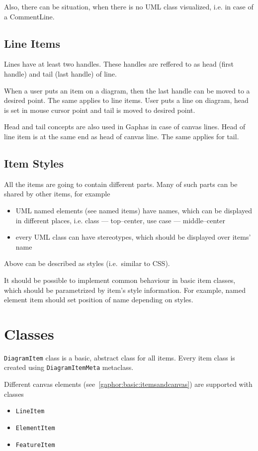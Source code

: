 \documentclass{book}
\newcommand{\rclass}[1]{\texttt{#1}}
\begin{document}
Also, there can be situation, when there is no UML class visualized, i.e.
in case of a CommentLine.

\subsection{Line Items}
Lines have at least two handles. These handles are reffered to as head (first
handle) and tail (last handle) of line.

When a user puts an item on a diagram, then the last handle can be moved to
a desired point. The same applies to line items. User puts a line on diagram,
head is set in mouse cursor point and tail is moved to desired point.

Head and tail concepts are also used in Gaphas in case of canvas lines.
Head of line item is at the same end as head of canvas line. The same
applies for tail.

\subsection{Item Styles}\label{itemstyles}
All the items are going to contain different parts.
Many of such parts can be shared by other items, for example
\begin{itemize}
\item UML named elements (see named items) have names, which
    can be displayed in different places, i.e. class --- top--center,
    use case --- middle--center
\item every UML class can have stereotypes, which should be displayed
    over items' name
\end{itemize}

Above can be described as styles (i.e.\ similar to CSS).

It should be possible to implement common behaviour in basic item classes,
which should be parametrized by item's style information. For example,
named element item should set position of name depending on styles.

\section{Classes}
\rclass{DiagramItem} class is a basic, abstract class for all items. Every
item class is created using \rclass{DiagramItemMeta} metaclass.

Different canvas elements (see~\ref{gaphor:basic:itemsandcanvas}) are
supported with classes
\begin{itemize}
\itemsep0pt
\item \rclass{LineItem}
\item \rclass{ElementItem}
\item \rclass{FeatureItem}
\end{itemize}
\end{document}
